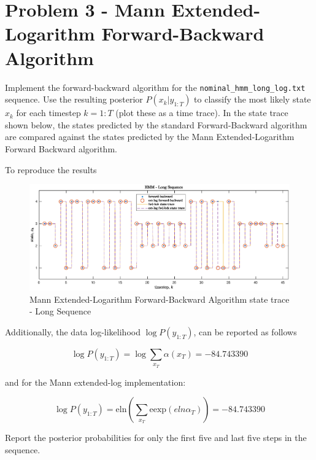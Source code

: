 \documentclass[]{article}
\begin{document}
\section*{Problem 3 - Mann Extended-Logarithm Forward-Backward Algorithm}

Implement the forward-backward algorithm for the \texttt{nominal\_hmm\_long\_log.txt} sequence. Use the resulting posterior $P(x_k \vert y_{1:T})$ to classify the most likely state $x_k$ for each timestep $k=1:T$ (plot these as a time trace). In the state trace shown below, the states predicted by the standard Forward-Backward algorithm are compared against the states predicted by the Mann Extended-Logarithm Forward Backward algorithm.

To reproduce the results 

\begin{figure}[H]
	\begin{center}  
		\includegraphics[scale=0.53]{p3_state_trace.eps}  
		\caption{Mann Extended-Logarithm Forward-Backward Algorithm state trace - Long Sequence}
		\label{fig:short_fb}
	\end{center}  
\end{figure}

Additionally, the data log-likelihood $\log P(y_{1:T})$, can be reported as follows

\begin{equation}
	\log P(y_{1:T}) = \log \sum_{x_T} \alpha(x_T) = -84.743390
\end{equation}

and for the Mann extended-log implementation:

\begin{equation}
\log P(y_{1:T}) = \text{eln}\left( \sum_{x_T} \text{eexp}\left(eln\alpha_T\right) \right) = -84.743390
\end{equation}

\newpage
Report the posterior probabilities for only the first five and last five steps in the sequence.
\end{document}
